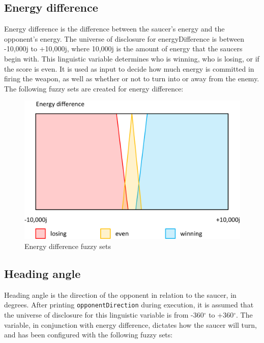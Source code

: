 \subsection{Energy difference}

Energy difference is the difference between the saucer's energy and the opponent's energy. The universe of disclosure for energyDifference is between -10,000j to +10,000j, where 10,000j is the amount of energy that the saucers begin with. This linguistic variable determines who is winning, who is losing, or if the score is even. It is used as input to decide how much energy is committed in firing the weapon, as well as whether or not to turn into or away from the enemy. The following fuzzy sets are created for energy difference:

\begin{figure}[H]
\centering
\caption{Energy difference fuzzy sets}
\includegraphics[scale=0.1]{./img/pdf/energyDiffSets.pdf}
\end{figure}

\subsection{Heading angle}

Heading angle is the direction of the opponent in relation to the saucer, in degrees. After printing \texttt{opponentDirection} during execution, it is assumed that the universe of disclosure for this linguistic variable is from -360$^{\circ}$ to +360$^{\circ}$. The variable, in conjunction with energy difference, dictates how the saucer will turn, and has been configured with the following fuzzy sets:

